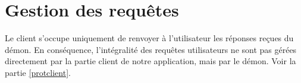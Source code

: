 	\section{Gestion des requ\^etes}

Le client s'occupe uniquement de renvoyer à l'utilisateur les réponses reçues
du démon. En conséquence, l'intégralité des requêtes utilisateurs ne sont pas 
gérées directement par la partie client de notre application, mais par le 
démon. Voir la partie \ref{protclient}.
	
